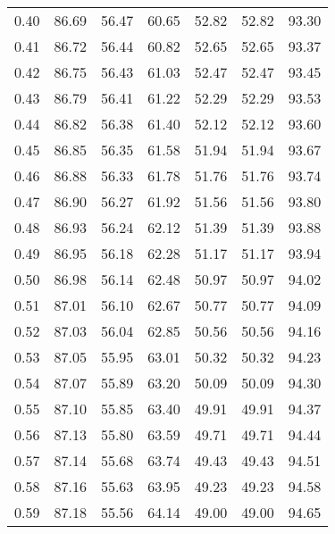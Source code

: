 \begin{tabular}{|c|c|c|c|c|c|c|}
      0.40 &     86.69 &     56.47 &      60.65 &   52.82 &      52.82 &         93.30 \\
      0.41 &     86.72 &     56.44 &      60.82 &   52.65 &      52.65 &         93.37 \\
      0.42 &     86.75 &     56.43 &      61.03 &   52.47 &      52.47 &         93.45 \\
      0.43 &     86.79 &     56.41 &      61.22 &   52.29 &      52.29 &         93.53 \\
      0.44 &     86.82 &     56.38 &      61.40 &   52.12 &      52.12 &         93.60 \\
      0.45 &     86.85 &     56.35 &      61.58 &   51.94 &      51.94 &         93.67 \\
      0.46 &     86.88 &     56.33 &      61.78 &   51.76 &      51.76 &         93.74 \\
      0.47 &     86.90 &     56.27 &      61.92 &   51.56 &      51.56 &         93.80 \\
      0.48 &     86.93 &     56.24 &      62.12 &   51.39 &      51.39 &         93.88 \\
      0.49 &     86.95 &     56.18 &      62.28 &   51.17 &      51.17 &         93.94 \\
      0.50 &     86.98 &     56.14 &      62.48 &   50.97 &      50.97 &         94.02 \\
      0.51 &     87.01 &     56.10 &      62.67 &   50.77 &      50.77 &         94.09 \\
      0.52 &     87.03 &     56.04 &      62.85 &   50.56 &      50.56 &         94.16 \\
      0.53 &     87.05 &     55.95 &      63.01 &   50.32 &      50.32 &         94.23 \\
      0.54 &     87.07 &     55.89 &      63.20 &   50.09 &      50.09 &         94.30 \\
      0.55 &     87.10 &     55.85 &      63.40 &   49.91 &      49.91 &         94.37 \\
      0.56 &     87.13 &     55.80 &      63.59 &   49.71 &      49.71 &         94.44 \\
      0.57 &     87.14 &     55.68 &      63.74 &   49.43 &      49.43 &         94.51 \\
      0.58 &     87.16 &     55.63 &      63.95 &   49.23 &      49.23 &         94.58 \\
      0.59 &     87.18 &     55.56 &      64.14 &   49.00 &      49.00 &         94.65 \\

\end{tabular}
